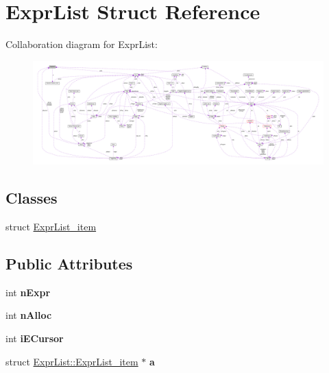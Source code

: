 \hypertarget{struct_expr_list}{\section{Expr\-List Struct Reference}
\label{struct_expr_list}
}


Collaboration diagram for Expr\-List\-:\nopagebreak
\begin{figure}[H]
\begin{center}
\leavevmode
\includegraphics[width=350pt]{struct_expr_list__coll__graph}
\end{center}
\end{figure}
\subsection*{Classes}
\begin{DoxyCompactItemize}
\item 
struct \hyperlink{struct_expr_list_1_1_expr_list__item}{Expr\-List\-\_\-item}
\end{DoxyCompactItemize}
\subsection*{Public Attributes}
\begin{DoxyCompactItemize}
\item 
\hypertarget{struct_expr_list_a88bdbd62cce306124eea63ae9f80ec33}{int {\bfseries n\-Expr}}\label{struct_expr_list_a88bdbd62cce306124eea63ae9f80ec33}

\item 
\hypertarget{struct_expr_list_a7e087b481e164f2b7e90fe81f0fa6c23}{int {\bfseries n\-Alloc}}\label{struct_expr_list_a7e087b481e164f2b7e90fe81f0fa6c23}

\item 
\hypertarget{struct_expr_list_aab870b9af60d25992f8672331d951ca0}{int {\bfseries i\-E\-Cursor}}\label{struct_expr_list_aab870b9af60d25992f8672331d951ca0}

\item 
\hypertarget{struct_expr_list_a02a4222d2dc4da64dcec416188abc16c}{struct \hyperlink{struct_expr_list_1_1_expr_list__item}{Expr\-List\-::\-Expr\-List\-\_\-item} $\ast$ {\bfseries a}}\label{struct_expr_list_a02a4222d2dc4da64dcec416188abc16c}

\end{DoxyCompactItemize}



